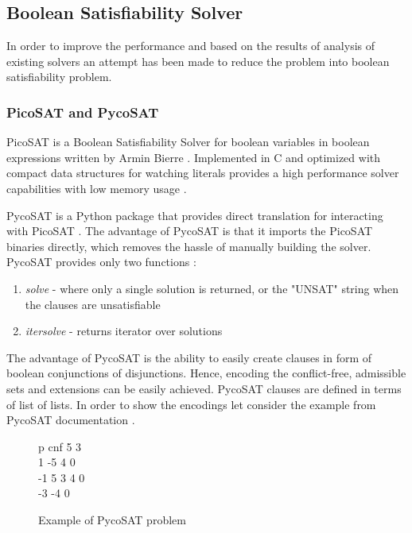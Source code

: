 \subsection{Boolean Satisfiability Solver} \label{section:satSolver}
In order to improve the performance and based on the results of analysis of existing solvers an attempt has been made to reduce the problem into boolean satisfiability problem. 

\subsubsection{PicoSAT and PycoSAT} \label{section:pycosat}
PicoSAT is a Boolean Satisfiability Solver for boolean variables in boolean expressions written by Armin Bierre \citep{picosatMan}. Implemented in C and optimized with compact data structures for watching literals provides a high performance solver capabilities with low memory usage \citep{picosat}.

PycoSAT is a Python package that provides direct translation for interacting with PicoSAT \citep{pycoSat}. The advantage of PycoSAT is that it imports the PicoSAT binaries directly, which removes the hassle of manually building the solver. PycoSAT provides only two functions \citep{pycosatPyPi}: 
\begin{enumerate}
	\item \textit{solve} - where only a single solution is returned, or the "UNSAT" string when the clauses are unsatisfiable
	\item \textit{itersolve} - returns iterator over solutions
\end{enumerate}

The advantage of PycoSAT is the ability to easily create clauses in form of boolean conjunctions of disjunctions. Hence, encoding the conflict-free, admissible sets and extensions can be easily achieved. PycoSAT clauses are defined in terms of list of lists. In order to show the encodings let consider the example from PycoSAT documentation \citep{pycosatGithub}. 

\begin{figure}
\begin{tcolorbox}
	p cnf 5 3 \\
	1 -5 4 0 \\ 
	-1 5 3 4 0 \\
	-3 -4 0 
\end{tcolorbox}
\caption{Example of PycoSAT problem}
\label{fig:pycosat1}
\end{figure}

